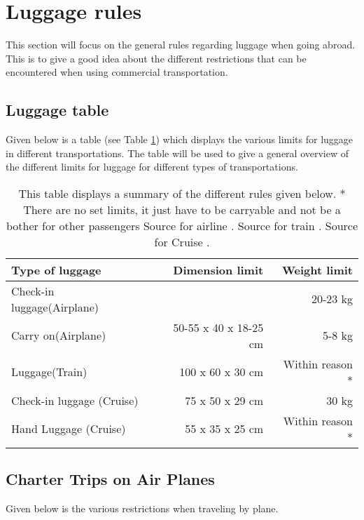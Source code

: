 \section{Luggage rules}
\label{sec:LugRules}
This section will focus on the general rules regarding luggage when going abroad. This is to give a good idea about the different restrictions that can be encountered when using commercial transportation.
\subsection{Luggage table}
Given below is a table (see Table \ref{tab:Lug}) which displays the various limits for luggage in different transportations. The table will be used to give a general overview of the different limits for luggage for different types of transportations.
\begin{table}[H]
\begin{tabular}{| l | r | r |}
\hline
Type of luggage &  Dimension limit & Weight limit \\ \hline
Check-in luggage(Airplane) & & 20-23 kg \\ \hline
Carry on(Airplane) & 50-55 x 40 x 18-25 cm & 5-8 kg \\ \hline
Luggage(Train) & 100 x 60 x 30 cm & Within reason *\\ \hline
Check-in luggage (Cruise) & 75 x 50 x 29 cm & 30 kg \\ \hline
Hand Luggage (Cruise) & 55 x 35 x 25 cm & Within reason *\\ \hline
\end{tabular}
\caption{This table displays a summary of the different rules given below.\newline
* There are no set limits, it just have to be carryable and not be a bother for other passengers\newline
Source for airline \citep{SAS}. Source for train \citep{idianrules}. Source for Cruise \citep{Cruise}.}
\label{tab:Lug}
\end{table}

\subsection{Charter Trips on Air Planes}
Given below is the various restrictions when traveling by plane.

